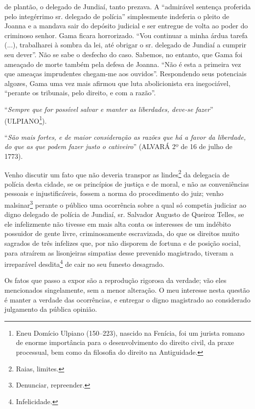 {\begin{didascalia}
{de plantão, o delegado de Jundiaí, tanto prezava. A ``admirável sentença
proferida pelo integérrimo sr. delegado de polícia'' simplesmente
indeferia o pleito de Joanna e a mandava sair do depósito judicial e ser
entregue de volta ao poder do criminoso senhor. Gama ficara horrorizado.
``Vou continuar a minha árdua tarefa (...), trabalharei à sombra da lei,
até obrigar o sr. delegado de Jundiaí a cumprir seu dever''. Não se sabe
o desfecho do caso. Sabemos, no entanto, que Gama foi ameaçado de morte
também pela defesa de Joanna. ``Não é esta a primeira vez que ameaças
imprudentes chegam-me aos ouvidos''. Respondendo seus potenciais algozes,
Gama uma vez mais afirmou que luta abolicionista era inegociável,
``perante os tribunais, pelo direito, e com a razão''.}
\end{didascalia}

\asterisc{}

``\emph{Sempre que for possível salvar e manter as liberdades, deve-se
fazer}'' (ULPIANO\footnote{ Eneu Domício Ulpiano (150--223), nascido na
  Fenícia, foi um jurista romano de enorme importância para o
  desenvolvimento do direito civil, da praxe processual, bem como da
  filosofia do direito na Antiguidade.}).

``\emph{São mais fortes, e de maior consideração as razões que há a favor
da liberdade, do que as que podem fazer justo o cativeiro}'' (ALVARÁ 2º
de 16 de julho de 1773).

Venho discutir um fato que não deveria transpor as lindes\footnote{
  Raias, limites.} da delegacia de polícia desta cidade, se os
princípios de justiça e de moral, e não as conveniências pessoais e
injustificáveis, fossem a norma do procedimento do juiz; venho
malsinar\footnote{ Denunciar, repreender.} perante o público uma
ocorrência sobre a qual só competia judiciar ao digno delegado de
polícia de Jundiaí, sr. Salvador Augusto de Queiroz Telles, se ele
infelizmente não tivesse em mais alta conta os interesses de um indébito
possuidor de gente livre, criminosamente escravizada, do que os direitos
muito sagrados de três infelizes que, por não disporem de fortuna e de
posição social, para atraírem as lisonjeiras simpatias desse prevenido
magistrado, tiveram a irreparável desdita\footnote{ Infelicidade.} de
cair no seu funesto desagrado.

Os fatos que passo a expor são a reprodução rigorosa da verdade; vão
eles mencionados singelamente, sem a menor alteração. O meu interesse
nesta questão é manter a verdade das ocorrências, e entregar o digno
magistrado ao considerado julgamento da pública opinião.

}
